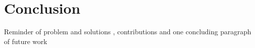 \chapter{Conclusion}

Reminder of problem and solutions , contributions and one concluding paragraph of future work